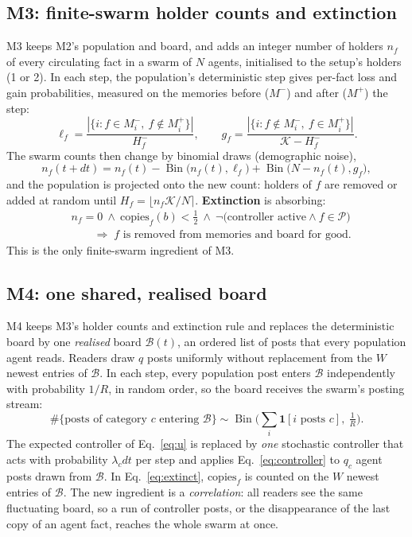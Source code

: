 \documentclass[10pt,a4paper]{article}
\newcommand{\Bin}{\operatorname{Bin}}
\newcommand{\Pool}{\mathcal{P}}
\newcommand{\ind}{\mathbf{1}}
\begin{document}
\subsection{M3: finite-swarm holder counts and extinction}
M3 keeps M2's population and board, and adds an integer number of holders $n_f$ of every circulating fact in a swarm
of $N$ agents, initialised to the setup's holders (1 or 2). In each step, the population's deterministic step gives
per-fact loss and gain probabilities, measured on the memories before ($M^-$) and after ($M^+$) the step:
\begin{equation}
  \ell_f=\frac{|\{i: f\in M_i^-,\ f\notin M_i^+\}|}{H_f^-},\qquad
  g_f=\frac{|\{i: f\notin M_i^-,\ f\in M_i^+\}|}{\mathcal{K}-H_f^-}.\label{eq:lossgain}
\end{equation}
The swarm counts then change by binomial draws (demographic noise),
\begin{equation}
  n_f(t+dt)=n_f(t)-\Bin\!\big(n_f(t),\ell_f\big)+\Bin\!\big(N-n_f(t),g_f\big),\label{eq:m3}
\end{equation}
and the population is projected onto the new count: holders of $f$ are removed or added at random until
$H_f=\lfloor n_f\mathcal{K}/N\rceil$. \textbf{Extinction} is absorbing:
\begin{equation}
\begin{aligned}
  &n_f=0\ \wedge\ \mathrm{copies}_f(b)<\tfrac12\ \wedge\ \neg\big(\text{controller active}\wedge f\in\Pool\big)\\
  &\qquad\Longrightarrow\; f\text{ is removed from memories and board for good}.
\end{aligned}\label{eq:extinct}
\end{equation}
This is the only finite-swarm ingredient of M3.

\subsection{M4: one shared, realised board}
M4 keeps M3's holder counts and extinction rule and replaces the deterministic board by one \emph{realised} board
$\mathcal{B}(t)$, an ordered list of posts that every population agent reads. Readers draw $q$ posts uniformly without
replacement from the $W$ newest entries of $\mathcal{B}$. In each step, every population post enters $\mathcal{B}$
independently with probability $1/R$, in random order, so the board receives the swarm's posting stream:
\begin{equation}
  \#\{\text{posts of category }c\text{ entering }\mathcal{B}\}\sim\Bin\!\Big(\textstyle\sum_i\ind[i\text{ posts }c],\ \tfrac1R\Big).\label{eq:thin}
\end{equation}
The expected controller of Eq.~\eqref{eq:u} is replaced by \emph{one} stochastic controller that acts with probability
$\lambda_c dt$ per step and applies Eq.~\eqref{eq:controller} to $q_c$ agent posts drawn from $\mathcal{B}$. In
Eq.~\eqref{eq:extinct}, $\mathrm{copies}_f$ is counted on the $W$ newest entries of $\mathcal{B}$. The new
ingredient is a \emph{correlation}: all readers see the same fluctuating board, so a run of controller posts, or the
disappearance of the last copy of an agent fact, reaches the whole swarm at once.
\end{document}
